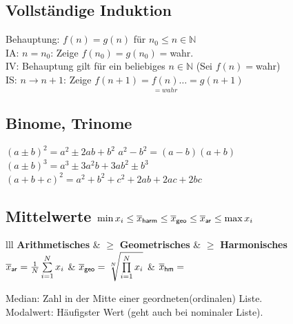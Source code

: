 \documentclass[german]{latex4ei/latex4ei_sheet}
\begin{document}
\begin{sectionbox}
	\subsection{Vollständige Induktion}
	Behauptung: $f(n)=g(n)$ für $n_0 \le n \in \mathbb N$\\ 
	IA: $n=n_0$: \quad Zeige $f(n_0)=g(n_0)=$wahr.\\
	IV: Behauptung gilt für ein beliebiges $n\in\mathbb N$ \quad (Sei $f(n)=$wahr)\\
	IS: $n \rightarrow n+1$: \quad Zeige $f(n+1)=\underset{=wahr}{f(n)}  \dotsc=g(n+1)$
\end{sectionbox}

\begin{sectionbox}
	\subsection*{Binome, Trinome}
	$(a\pm b)^2 = a^2 \pm 2ab + b^2$ \hfill $a^2 - b^2 = (a-b)(a+b)$\\
	$(a \pm b)^3 = a^3 \pm 3a^2b + 3ab^2 \pm b^3$\\
	$(a+b+c)^2 = a^2 + b^2 + c^2 + 2ab + 2ac + 2bc$
\end{sectionbox}


\begin{sectionbox}
	\subsection{Mittelwerte \quad $\min x_i \le \overline{x}_{\sf harm} \le \overline{x}_{\sf geo} \le \overline{x}_{\sf ar} \le \max x_i$}
	\begin{tablebox}{lll} 
	\textbf{Arithmetisches} & $\ge$ \textbf{Geometrisches} & $\ge$ \textbf{Harmonisches}\\ \cmrule
	$\overline{x}_{\sf ar} = \frac{1}{N} \sum\limits^N_{i = 1} x_i$ & $\overline{x}_{\sf geo} = \sqrt[N]{ \prod\limits^N_{i = 1} x_i }$ & $\overline{x}_{\sf hm} =$\\ 
	\end{tablebox}
	Median: Zahl in der Mitte einer geordneten(ordinalen) Liste.\\
	Modalwert: Häufigster Wert (geht auch bei nominaler Liste).
\end{sectionbox}
\end{document}
